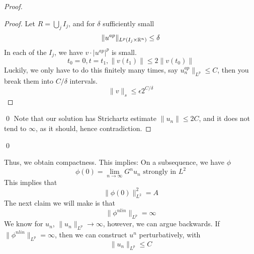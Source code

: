 \begin{proof}
\begin{proof}
        Let $R=\bigcup_j I_j$, and for $\delta$ sufficiently small
        \begin{equation*}
            \|u^{ap}\|_{L^p(I_j\times\mathbb{R}^n)}\leq\delta
        \end{equation*}
        In each of the $I_j$, we have $v\cdot|u^{ap}|^p$ is small.
        \begin{equation*}
            t_0=0, t=t_1, \|v(t_1)\|\leq 2\|v(t_0)\|
        \end{equation*}
        Luckily, we only have to do this finitely many times, say $u_n^{ap}\|_{L^p}\leq C$, then you break them into $C/\delta$ intervals. 
        \begin{equation*}
            \|v\|_s\leq \epsilon 2^{C/\delta} 
        \end{equation*}
    \end{proof}
    \qed
    Note that our solution has Strichartz estimate $\|u_n\|\leq 2C$, and it does not tend to $\infty$, as it should, hence contradiction.
\end{proof}
\qed

Thus, we obtain compactness. This implies:
On a subsequence, we have $\phi$
\begin{equation*}
    \phi(0)=\lim_{n\to\infty}G^n u_n \text{ strongly in } L^2
\end{equation*}
This implies that 
\begin{equation*}
    \|\phi(0)\|_{L^2}^2=A
\end{equation*}
The next claim we will make is that
\begin{equation*}
    \|\phi^{nlin}\|_{L^p}=\infty
\end{equation*}
We know for $u_n$, $\|u_n\|_{L^p}\to\infty$, however, we can argue backwards. If $\|\phi^{nlin}\|_{L^p}=\infty$, then we can construct $u^n$ perturbatively, with
\begin{equation*}
    \|u_n\|_{L^p}\leq C
\end{equation*}

